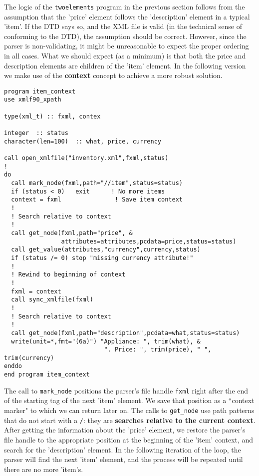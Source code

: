 \documentclass[11pt]{article}
\begin{document}
The logic of the \texttt{twoelements} program in the previous section
 follows from the assumption that the 'price' element follows the
 'description' element in a typical 'item'. If the DTD says so, and
 the XML file is valid (in the technical sense of conforming to the
 DTD), the assumption should be correct. However, since the parser is
 non-validating, it might be unreasonable to expect the proper
 ordering in all cases. What we should expect (as a minimum) is that
 both the price and description elements are children of the 'item'
 element. In the following version we make use of the \textbf{context}
 concept to achieve a more robust solution.
%
\begin{verbatim}
program item_context
use xmlf90_xpath

type(xml_t) :: fxml, contex

integer  :: status
character(len=100)  :: what, price, currency

call open_xmlfile("inventory.xml",fxml,status)
!
do
  call mark_node(fxml,path="//item",status=status)
  if (status < 0)   exit      ! No more items
  context = fxml               ! Save item context   
  !
  ! Search relative to context
  !
  call get_node(fxml,path="price", &
                attributes=attributes,pcdata=price,status=status)
  call get_value(attributes,"currency",currency,status)
  if (status /= 0) stop "missing currency attribute!"
  !
  ! Rewind to beginning of context
  !
  fxml = context
  call sync_xmlfile(fxml)  
  !
  ! Search relative to context
  !
  call get_node(fxml,path="description",pcdata=what,status=status)
  write(unit=*,fmt="(6a)") "Appliance: ", trim(what), &
                            ". Price: ", trim(price), " ", trim(currency)
enddo
end program item_context
\end{verbatim}
%
The call to \texttt{mark\_node} positions the parser's file handle
\texttt{fxml} right after the end of the starting tag of the next
'item' element. We save that position as a ``context marker" to which
we can return later on. The calls to \texttt{get\_node} use path
patterns that do not start with a \texttt{/}: they are
\textbf{searches relative to the current context}. After getting the
information about the 'price' element, we restore the parser's file
handle to the appropriate position at the beginning of the 'item'
context, and search for the 'description' element. In the following
iteration of the loop, the parser will find the next 'item' element,
and the process will be repeated until there are no more 'item's.
\end{document}
